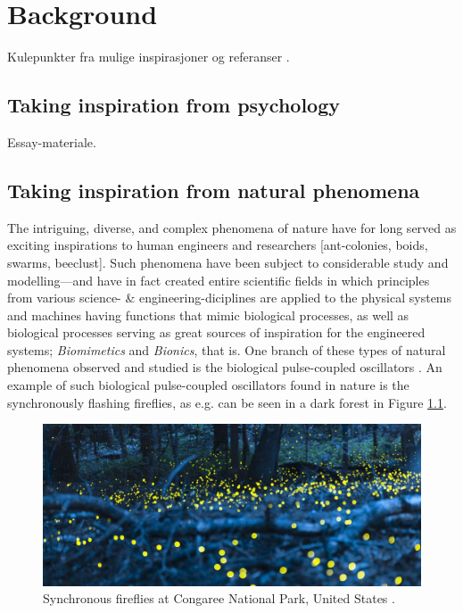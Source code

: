 \chapter{Background}
\label{chap:background}
Kulepunkter  fra mulige inspirasjoner og referanser .




\section{Taking inspiration from psychology}

Essay-materiale.





\section{Taking inspiration from natural phenomena}
The intriguing, diverse, and complex phenomena of nature have for long served as exciting inspirations to human engineers and researchers [ant-colonies, boids, swarms, beeclust]. Such phenomena have been subject to considerable study and modelling—and have in fact created entire scientific fields \cite{biomimetics, bionics} in which principles from various science- \& engineering-diciplines are applied to the physical systems and machines having functions that mimic biological processes, as well as biological processes serving as great sources of inspiration for the engineered systems; \textit{Biomimetics} and \textit{Bionics}, that is. One branch of these types of natural phenomena observed and studied is the biological pulse-coupled oscillators \cite{russerMinimalAssumptionsReferanser}. An example of such biological pulse-coupled oscillators found in nature is the synchronously flashing fireflies, as e.g. can be seen in a dark forest in Figure \ref{fig:synched_fireflies_phenomenon}.

\begin{figure}[!ht]
	\centering
	\includegraphics[width=0.9\linewidth]{Assets/Figures/synchronized_fireflies_phenomenon.jpg}
	\caption[Picture of fireflies flashing synchronously in a US National Park]{Synchronous fireflies at Congaree National Park, United States \cite{synched_fireflies_phenomenon}.}
	\label{fig:synched_fireflies_phenomenon}
\end{figure}

